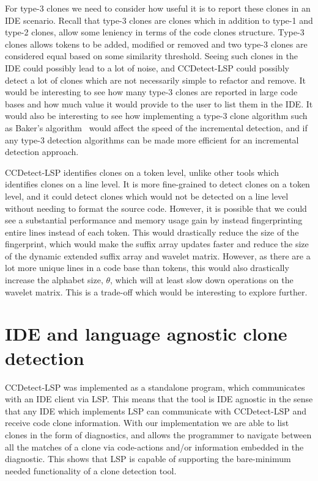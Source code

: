 For type-3 clones we need to consider how useful it is to report these clones in an IDE
scenario. Recall that type-3 clones are clones which in addition to type-1 and type-2
clones, allow some leniency in terms of the code clones structure. Type-3 clones allows
tokens to be added, modified or removed and two type-3 clones are considered equal based
on some similarity threshold. Seeing such clones in the IDE could possibly lead to a lot
of noise, and CCDetect-LSP could possibly detect a lot of clones which are not necessarily
simple to refactor and remove. It would be interesting to see how many type-3 clones are
reported in large code bases and how much value it would provide to the user to list them
in the IDE. It would also be interesting to see how implementing a type-3 clone algorithm
such as Baker's algorithm~\cite{BakerSparseDynamicProgramming} would affect the speed of
the incremental detection, and if any type-3 detection algorithms can be made more
efficient for an incremental detection approach.

CCDetect-LSP identifies clones on a token level, unlike other tools which identifies
clones on a line level\cite{Zibran_real_time_search}. It is more fine-grained to detect
clones on a token level, and it could detect clones which would not be detected on a line
level without needing to format the source code. However, it is possible that we could see
a substantial performance and memory usage gain by instead fingerprinting entire lines
instead of each token. This would drastically reduce the size of the fingerprint, which
would make the suffix array updates faster and reduce the size of the dynamic extended
suffix array and wavelet matrix. However, as there are a lot more unique lines in a code
base than tokens, this would also drastically increase the alphabet size, $\theta$, which
will at least slow down operations on the wavelet matrix. This is a trade-off which would
be interesting to explore further.

\section{IDE and language agnostic clone detection}

CCDetect-LSP was implemented as a standalone program, which communicates with an IDE
client via LSP. This means that the tool is IDE agnostic in the sense that any IDE which
implements LSP can communicate with CCDetect-LSP and receive code clone information. With
our implementation we are able to list clones in the form of diagnostics, and allows the
programmer to navigate between all the matches of a clone via code-actions and/or
information embedded in the diagnostic. This shows that LSP is capable of supporting the
bare-minimum needed functionality of a clone detection tool. 

